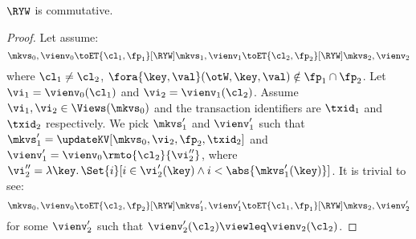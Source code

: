 \begin{lemma}
    \label{lem:ryw-comm}
    \(\RYW\) is commutative.
\end{lemma}
\begin{proof}
    Let assume:
    \[
        \mkvs_0, \vienv_0 \toET{\cl_1, \fp_1}[\RYW] \mkvs_1, \vienv_1 \toET{\cl_2, \fp_2}[\RYW] \mkvs_2, \vienv_2 
    \]
    where \( \cl_1 \neq \cl_2 \), \( \fora{ \key,\val } (\otW, \key, \val) \notin \fp_1 \cap \fp_2 \).
    Let \(\vi_1 = \vienv_0(\cl_1) \) and \( \vi_2 = \vienv_1(\cl_2)\).
    Assume \( \vi_1, \vi_2 \in \Views(\mkvs_0)\) and the transaction identifiers are \( \txid_1 \) and \( \txid_2 \) respectively.
    We pick \( \mkvs'_1 \) and \( \vienv'_1 \) such that \( \mkvs'_1 = \updateKV[\mkvs_0,\vi_2,\fp_2,\txid_2] \) and \( \vienv'_1 = \vienv_0\rmto{\cl_2}{\vi''_2} \),
    where \( \vi''_2 = \lambda \key \ldotp \Set{ i }[ i \in \vi'_2(\key) \land i < \abs{\mkvs'_1(\key)}] \).
    It is trivial to see:
    \[
        \mkvs_0, \vienv_0 \toET{\cl_2, \fp_2}[\RYW] \mkvs'_1, \vienv'_1 \toET{\cl_1,\fp_1}[\RYW] \mkvs_2, \vienv'_2 
    \]
    for some \( \vienv'_2 \) such that \( \vienv'_2(\cl_2) \viewleq \vienv_2(\cl_2) \).
\end{proof}

